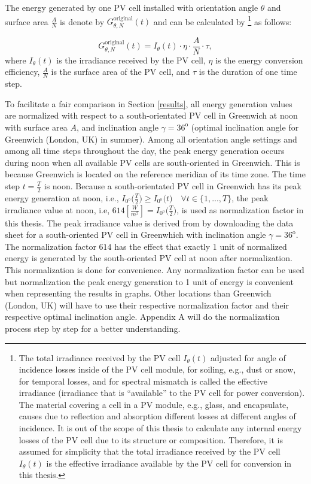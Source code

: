  
The energy generated by one PV cell installed with orientation angle $\theta$ and surface area $\frac{A}{N}$ is denote by $G^{\text{original}}_{\theta,N}(t)$ and can be calculated by \cite{add}\footnote{The total irradiance received by the PV cell $I_{\theta}(t)$ adjusted for angle of incidence losses inside of the PV cell module, for soiling, e.g., dust or snow, for temporal losses, and for spectral mismatch is called the effective irradiance (irradiance that is “available” to the PV cell for power conversion). The material covering a cell in a PV module, e.g., glass, and encapsulate, causes due to reflection and absorption different losses at different angles of incidence. It is out of the scope of this thesis to calculate any internal energy losses of the PV cell due to its structure or composition. Therefore, it is assumed for simplicity that the total irradiance received by the PV cell $I_{\theta}(t)$ is the effective irradiance available by the PV cell for conversion in this thesis.} as follows:

\begin{equation}\label{normalization}
G^{\text{original}}_{\theta,N}(t)=I_{\theta}(t) \cdot \eta \cdot \frac{A}{N} \cdot \tau,
\end{equation}
where $I_{\theta}(t)$ is the irradiance received by the PV cell, $\eta$ is the energy conversion efficiency, $\frac{A}{N}$ is the surface area of the PV cell, and $\tau$ is the duration of one time step.

To facilitate a fair comparison in Section \ref{results}, all energy generation values are normalized with respect to a south-orientated PV cell in Greenwich at noon with surface area $A$, and inclination angle $\gamma=36^{\mathrm{o}}$ (optimal inclination angle for Greenwich (London, UK) in summer). Among all orientation angle settings and among all time steps throughout the day, the peak energy generation occurs during noon when all available PV cells are south-oriented in Greenwich. This is because Greenwich is located on the reference meridian of its time zone. The time step $t=\frac{T}{2}$ is noon. Because a south-orientated PV cell in Greenwich has its peak energy generation at noon, i.e., $I_{0^{\mathrm{o}}}\big(\frac{T}{2}\big)\geq I_{0^{\mathrm{o}}}\big(t\big)\quad \forall t\in\{1,...,T\}$, the peak irradiance value at noon, i.e, $614[\frac{W}{m^2}]=I_{0^{\mathrm{o}}}\big(\frac{T}{2}\big)$, is used as normalization factor in this thesis. The peak irradiance value is derived from \cite{PVGIS} by downloading the data sheet for a south-oriented PV cell in Greenwhich with  inclination angle $\gamma=36^{\mathrm{o}}$. The normalization factor $614$ has the effect that exactly 1 unit of normalized energy is generated by the south-oriented PV cell at noon after normalization. This normalization is done for convenience. Any normalization factor can be used but normalization the peak energy generation to 1 unit of energy is convenient when representing the results in graphs. Other locations than Greenwich (London, UK) will have to use their respective normalization factor and their respective optimal inclination angle. Appendix A will do the normalization process step by step for a better understanding.


